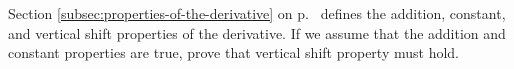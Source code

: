 Section \ref{subsec:properties-of-the-derivative} on p.~\pageref{subsec:properties-of-the-derivative}
defines the addition, constant, and vertical shift properties of the derivative.
If we assume that the addition and constant properties are true, prove that vertical
shift property must hold.
